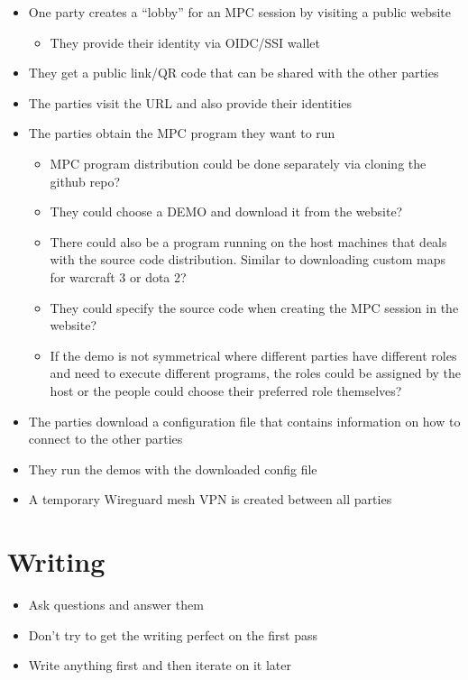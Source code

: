 \begin{itemize}
\tightlist
\item
  One party creates a ``lobby'' for an MPC session by visiting a public
  website

  \begin{itemize}
  \tightlist
  \item
    They provide their identity via OIDC/SSI wallet
  \end{itemize}
\item
  They get a public link/QR code that can be shared with the other
  parties
\item
  The parties visit the URL and also provide their identities
\item
  The parties obtain the MPC program they want to run

  \begin{itemize}
  \tightlist
  \item
    MPC program distribution could be done separately via cloning the
    github repo?
  \item
    They could choose a DEMO and download it from the website?
  \item
    There could also be a program running on the host machines that
    deals with the source code distribution. Similar to downloading
    custom maps for warcraft 3 or dota 2?
  \item
    They could specify the source code when creating the MPC session in
    the website?
  \item
    If the demo is not symmetrical where different parties have
    different roles and need to execute different programs, the roles
    could be assigned by the host or the people could choose their
    preferred role themselves?
  \end{itemize}
\item
  The parties download a configuration file that contains information on
  how to connect to the other parties
\item
  They run the demos with the downloaded config file
\item
  A temporary Wireguard mesh VPN is created between all parties
\end{itemize}

\hypertarget{writing}{%
\chapter{Writing}\label{writing}}

\begin{itemize}
\tightlist
\item
  Ask questions and answer them
\item
  Don't try to get the writing perfect on the first pass
\item
  Write anything first and then iterate on it later
\end{itemize}

